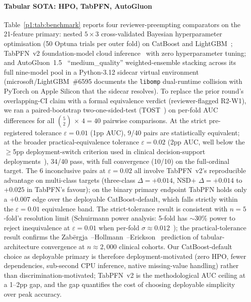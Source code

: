\documentclass[10pt,letterpaper]{article}
\begin{document}
\paragraph*{Tabular SOTA: HPO, TabPFN, AutoGluon}\label{p1:sec:results:tabular} Table~\ref{p1:tab:benchmark} reports four reviewer-preempting comparators on the 21-feature primary: nested $5{\times}3$ cross-validated Bayesian hyperparameter optimisation (50 Optuna trials per outer fold) on CatBoost and LightGBM~\cite{cawleytalbot2010}; TabPFN~v2 foundation-model cloud inference~\cite{hollmann2025tabpfn} with zero hyperparameter tuning; and AutoGluon~1.5~\cite{erickson2020autogluon} ``medium\_quality'' weighted-ensemble stacking across its full nine-model pool in a Python-3.12 sidecar virtual environment (microsoft/LightGBM~\#6595 documents the \texttt{libomp} dual-runtime collision with PyTorch on Apple Silicon that the sidecar resolves). To replace the prior round's overlapping-CI claim with a formal equivalence verdict (reviewer-flagged R2-W1), we ran a paired-bootstrap two-one-sided-test (TOST~\cite{schuirmann1987}) on per-fold AUC differences for all $\binom{5}{2}\,{\times}\,4 = 40$ pairwise comparisons. At the strict pre-registered tolerance $\varepsilon{=}0.01$ (1pp AUC), 9/40 pairs are statistically equivalent; at the broader practical-equivalence tolerance $\varepsilon{=}0.02$ (2pp AUC, well below the $\geq$5pp deployment-switch criterion used in clinical decision-support deployments~\cite{lakens2017tost}), 34/40 pass, with full convergence (10/10) on the full-ordinal target. The 6 inconclusive pairs at $\varepsilon{=}0.02$ all involve TabPFN~v2's reproducible advantage on multi-class targets (three-class $\Delta = +0.014$, NSD$+$ $\Delta = +0.014$ to $+0.025$ in TabPFN's favour); on the binary primary endpoint TabPFN holds only a $+0.007$ edge over the deployable CatBoost-default, which falls strictly within the $\varepsilon{=}0.01$ equivalence band. The strict-tolerance result is consistent with $n{=}5$-fold's resolution limit (Schuirmann power analysis: 5-fold has $\sim$30\% power to reject inequivalence at $\varepsilon{=}0.01$ when per-fold $\sigma \approx 0.012$~\cite{schuirmann1987}); the practical-tolerance result confirms the Zab\"{e}rgja~\cite{zabergja2024dltabular}--Hollmann~\cite{hollmann2025tabpfn}--Erickson~\cite{erickson2020autogluon} prediction of tabular-architecture convergence at $n \approx 2{,}000$ clinical cohorts. Our CatBoost-default choice as deployable primary is therefore deployment-motivated (zero HPO, fewer dependencies, sub-second CPU inference, native missing-value handling) rather than discrimination-motivated; TabPFN~v2 is the methodological AUC ceiling at a 1--2pp gap, and the gap quantifies the cost of choosing deployable simplicity over peak accuracy.
\end{document}
